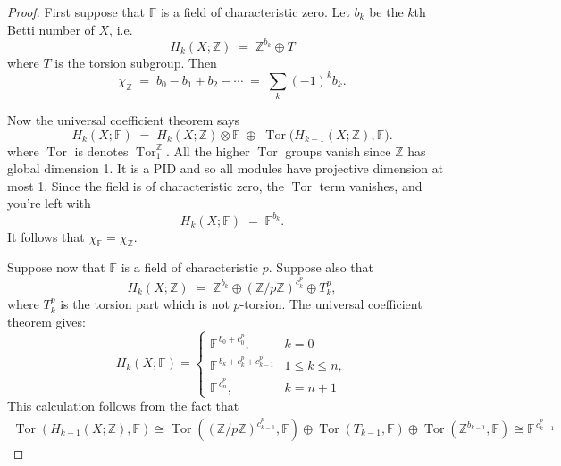 \documentclass[12pt]{article}
\begin{document}
\begin{proof}
    First suppose that $\mathbb{F}$ is a field of characteristic zero.  
Let $b_k$ be the $k$th Betti number of $X$, i.e.
\[
H_k(X;\mathbb{Z}) \;=\; \mathbb{Z}^{b_k} \oplus T
\]
where $T$ is the torsion subgroup. Then
\[
\chi_{\mathbb{Z}}
\;=\;
b_0 - b_1 + b_2 - \cdots
\;=\;
\sum_k (-1)^k b_k.
\]

\noindent
Now the universal coefficient theorem says
\[
H_k(X;\mathbb{F})
\;=\;
H_k(X;\mathbb{Z}) \otimes \mathbb{F}
\;\oplus\;
\operatorname{Tor}\bigl(H_{k-1}(X;\mathbb{Z}), \mathbb{F}\bigr).
\] where $\operatorname{Tor}$ is denotes $\operatorname{Tor}_1^{\mathbb{Z}}$. All the higher $\operatorname{Tor}$ groups vanish since $\mathbb{Z}$ has global dimension 1. It is a PID and so all modules have projective dimension at most 1.
Since the field is of characteristic zero, the $\operatorname{Tor}$ term vanishes, and you're left with
\[
H_k(X;\mathbb{F}) \;=\; \mathbb{F}^{b_k}.
\]
It follows that $\chi_{\mathbb{F}} = \chi_{\mathbb{Z}}$.

Suppose now that $\mathbb{F}$ is a field of characteristic $p$.  
Suppose also that
\[
H_k(X;\mathbb{Z})
\;=\;
\mathbb{Z}^{b_k}
\oplus
(\mathbb{Z}/p\mathbb{Z})^{c_k^p}
\oplus
T_k^p,
\]
where $T_k^p$ is the torsion part which is not $p$-torsion.  
The universal coefficient theorem gives:
\[
H_k(X;\mathbb{F})
=
\begin{cases}
\mathbb{F}^{\,b_0 + c_0^p}, & k = 0 \\[4pt]
\mathbb{F}^{\,b_k + c_k^p + c_{k-1}^p} & 1 \le k \le n, \\[4pt]
\mathbb{F}^{\,c_n^p}, & k = n+1
\end{cases}
\]
This calculation follows from the fact that
\begin{align*}
    \operatorname{Tor}(H_{k-1}(X;\mathbb Z),\mathbb F)
\cong
\operatorname{Tor}((\mathbb Z/p\mathbb Z)^{c_{k-1}^p},\mathbb F) \oplus 
\operatorname{Tor}(T_{k-1},\mathbb F)
\oplus \operatorname{Tor}(\mathbb Z^{b_{k-1}},\mathbb F)
\cong
\mathbb F^{\,c_{k-1}^p}
\end{align*}


\end{proof}
\end{document}
